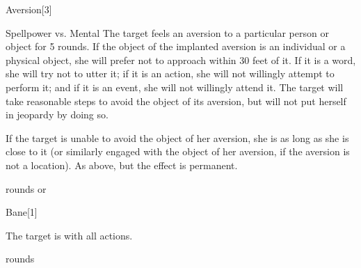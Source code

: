 \begin{spellsection}{Aversion}[3]
    \begin{spellheader}
    \end{spellheader}
    \begin{spellcontent}
        \begin{spelltargetinginfo}
        \end{spelltargetinginfo}
        \begin{spelleffects}
            \begin{spellattack}{Spellpower vs. Mental}
                \spellsuccess The target feels an aversion to a particular person or object for 5 rounds. If the object of the implanted aversion is an individual or a physical object, she will prefer not to approach within 30 feet of it. If it is a word, she will try not to utter it; if it is an action, she will not willingly attempt to perform it; and if it is an event, she will not willingly attend it. The target will take reasonable steps to avoid the object of its aversion, but will not put herself in jeopardy by doing so.
                \par If the target is unable to avoid the object of her aversion, she is \severelyimpaired as long as she is close to it (or similarly engaged with the object of her aversion, if the aversion is not a location).
                \spellcritical As above, but the effect is permanent.
            \end{spellattack}
             rounds or \durperm
        \end{spelleffects}
    \end{spellcontent}
    \begin{spellfooter}
        \miscastrandom
    \end{spellfooter}
\end{spellsection}


\begin{spellsection}{Bane}[1]
    \begin{spellheader}
    \end{spellheader}
    \begin{spellcontent}
        \begin{spelltargetinginfo}
        \end{spelltargetinginfo}
        \begin{spelleffects}
            \spelleffect The target is \impaired with all actions.

             rounds
        \end{spelleffects}
    \end{spellcontent}
    \begin{spellfooter}
        \miscastrandom
    \end{spellfooter}
\end{spellsection}

